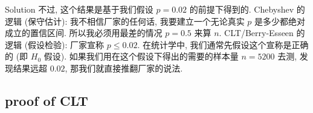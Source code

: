 \begin{qlsolution}{Solution}
不过, 这个结果是基于我们假设 \(\mathit{p} = 0.02\) 的前提下得到的. Chebyshev 的逻辑 (保守估计): 我不相信厂家的任何话, 我要建立一个无论真实 \(\mathit{p}\) 是多少都绝对成立的置信区间. 所以我必须用最差的情况 \(\mathit{p} = 0.5\) 来算 \(\mathit{n}\). CLT/Berry-Esseen 的逻辑 (假设检验): 厂家宣称 \(\mathit{p} \leq 0.02\). 在统计学中, 我们通常先假设这个宣称是正确的 (即 \(\mathit{H}_{0}\) 假设). 如果我们用在这个假设下得出的需要的样本量 \(\mathit{n} = 5200\) 去测, 发现结果远超 \(0.02\), 那我们就直接推翻厂家的说法.

\end{qlsolution}

\subsection{proof of CLT}\label{proof-of-clt}
